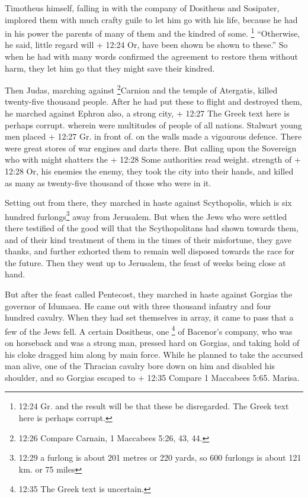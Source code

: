  Timotheus himself, falling in with the company of
Dositheus and Sosipater, implored them with much crafty guile to let him
go with his life, because he had in his power the parents of many of
them and the kindred of some. \footnote{12:24 Gr. and the result will be
  that these be disregarded. The Greek text here is perhaps corrupt.}
``Otherwise, he said, little regard will + 12:24 Or, have been shown be
shown to these.''  So when he had with many words confirmed
the agreement to restore them without harm, they let him go that they
might save their kindred.

 Then Judas, marching against \footnote{12:26 Compare
  Carnain, 1 Maccabees 5:26, 43, 44.}Carnion and the temple of
Atergatis, killed twenty-five thousand people.  After he
had put these to flight and destroyed them, he marched against Ephron
also, a strong city, + 12:27 The Greek text here is perhaps corrupt.
wherein were multitudes of people of all nations. Stalwart young men
placed + 12:27 Gr. in front of. on the walls made a vigourous defence.
There were great stores of war engines and darts there. 
But calling upon the Sovereign who with might shatters the + 12:28 Some
authorities read weight. strength of + 12:28 Or, his enemies the enemy,
they took the city into their hands, and killed as many as twenty-five
thousand of those who were in it.

 Setting out from there, they marched in haste against
Scythopolis, which is six hundred furlongs\footnote{12:29 a furlong is
  about 201 metres or 220 yards, so 600 furlongs is about 121 km. or 75
  miles} away from Jerusalem.  But when the Jews who were
settled there testified of the good will that the Scythopolitans had
shown towards them, and of their kind treatment of them in the times of
their misfortune,  they gave thanks, and further exhorted
them to remain well disposed towards the race for the future. Then they
went up to Jerusalem, the feast of weeks being close at hand.

 But after the feast called Pentecost, they marched in
haste against Gorgias the governor of Idumaea.  He came out
with three thousand infantry and four hundred cavalry. 
When they had set themselves in array, it came to pass that a few of the
Jews fell.  A certain Dositheus, one \footnote{12:35 The
  Greek text is uncertain.} of Bacenor's company, who was on horseback
and was a strong man, pressed hard on Gorgias, and taking hold of his
cloke dragged him along by main force. While he planned to take the
accursed man alive, one of the Thracian cavalry bore down on him and
disabled his shoulder, and so Gorgias escaped to + 12:35 Compare 1
Maccabees 5:65. Marisa.

